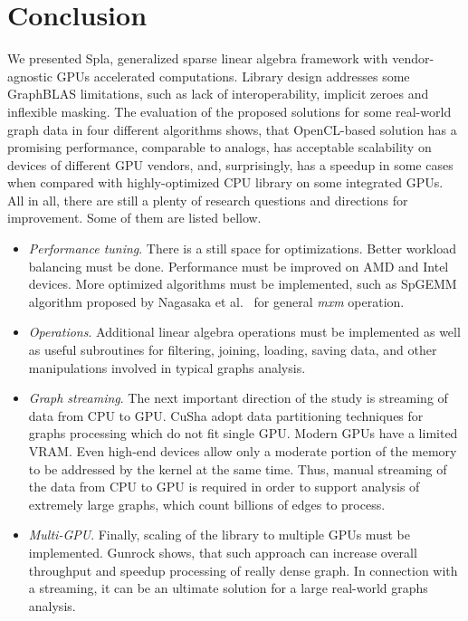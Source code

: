 \section{Conclusion}

We presented Spla, generalized sparse linear algebra framework with vendor-agnostic GPUs accelerated computations. Library design addresses some GraphBLAS limitations, such as lack of interoperability, implicit zeroes and inflexible masking. The evaluation of the proposed solutions for some real-world graph data in four different algorithms shows, that OpenCL-based solution has a promising performance, comparable to analogs, has acceptable scalability on devices of different GPU vendors, and, surprisingly, has a speedup in some cases when compared with highly-optimized CPU library on some integrated GPUs. All in all, there are still a plenty of research questions and directions for improvement. Some of them are listed bellow.

\begin{itemize}
    \item \textit{Performance tuning}. There is a still space for optimizations. Better workload balancing must be done. Performance must be improved on AMD and Intel devices. More optimized algorithms must be implemented, such as SpGEMM  algorithm proposed by Nagasaka et al.~\cite{8025284/spgemm/nagasaka} for general \textit{mxm} operation.
    \item \textit{Operations}. Additional linear algebra operations must be implemented as well as useful subroutines for filtering, joining, loading, saving data, and other manipulations involved in typical graphs analysis.
    \item \textit{Graph streaming}. The next important direction of the study is streaming of data from CPU to GPU. CuSha adopt data partitioning techniques for graphs processing which do not fit single GPU. Modern GPUs have a limited VRAM. Even high-end devices allow only a moderate portion of the memory to be addressed by the kernel at the same time. Thus, manual streaming of the data from CPU to GPU is required in order to support analysis of extremely large graphs, which count billions of edges to process.
    \item \textit{Multi-GPU}. Finally, scaling of the library to multiple GPUs must be implemented. Gunrock shows, that such approach can increase overall throughput and speedup processing of really dense graph. In connection with a streaming, it can be an ultimate solution for a large real-world graphs analysis.
\end{itemize}